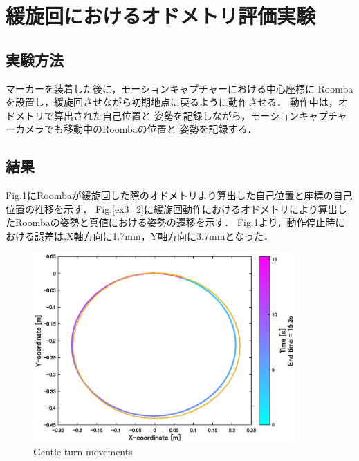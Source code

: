 \documentclass[a4paper,11pt]{jsarticle}
\begin{document}
\newpage

\section{緩旋回におけるオドメトリ評価実験}\label{ex3}
\subsection{実験方法}
マーカーを装着した後に，モーションキャプチャーにおける中心座標に
Roombaを設置し，緩旋回させながら初期地点に戻るように動作させる．
動作中は，オドメトリで算出された自己位置と
姿勢を記録しながら，モーションキャプチャーカメラでも移動中のRoombaの位置と
姿勢を記録する．

\subsection{結果}
Fig.\ref{ex3_1}にRoombaが緩旋回した際のオドメトリより算出した自己位置と座標の自己位置の推移を示す．
Fig.\ref{ex3_2}に緩旋回動作におけるオドメトリにより算出したRoombaの姿勢と真値における姿勢の遷移を示す．
Fig.\ref{ex3_1}より，動作停止時における誤差は,X軸方向に1.7mm，Y軸方向に3.7mmとなった．



\begin{figure}[H]\centering
\includegraphics[width=100mm]{figure/3_1.eps}
\caption{Gentle turn movements}
\label{ex3_1}\vspace{0zh}\end{figure}
\end{document}
